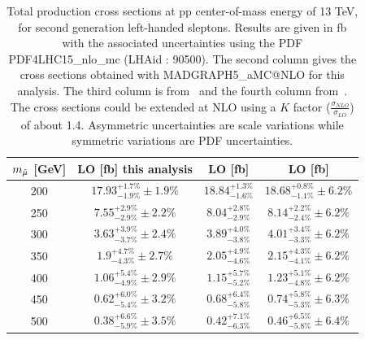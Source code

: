 \documentclass{cernatlasnote}
\begin{document}
\begin{appendices}
\begin{table}
    \centering
    \caption{Total production cross sections at pp center-of-mass  energy of 13 TeV, for second generation left-handed sleptons. Results are given in fb with the associated uncertainties using the PDF PDF4LHC15\_nlo\_mc (LHAid : 90500). The second column gives the cross sections obtained with MADGRAPH5\_aMC@NLO for this analysis. The third column is from~\cite{Fuks_2014} and the fourth column from~\cite{Fiaschi_2018}. The cross sections could be extended at NLO using a $K$ factor ($\frac{\sigma_{NLO}}{\sigma_{LO}}$) of about 1.4. Asymmetric uncertainties are scale variations while symmetric variations are PDF uncertainties.} 
    \label{tab:LEFTXS}
    \smallskip
    \begin{tabular}{ cccc }
         $m_{\Tilde{\mu}}$ [GeV]  & LO [fb] this analysis & LO [fb] \cite{Fuks_2014} & LO [fb] \cite{Fiaschi_2018} \\
         \hline
         200  & $17.93^{+1.7\%}_{-1.9\%} \pm 1.9\%$  & $18.84^{+1.3\%}_{-1.6\%}$ & $18.68^{+0.8\%}_{-1.1\%} \pm 6.2\%$ \\
         250  & $7.55^{+2.9\%}_{-2.9\%} \pm 2.2\% $  & $8.04^{+2.8\%}_{-2.9\%}$  & $8.14^{+2.2\%}_{-2.4\%} \pm 6.2\%$  \\
         300  & $3.63^{+3.9\%}_{-3.7\%} \pm 2.4\%$   & $3.89^{+4.0\%}_{-3.8\%}$  & $4.01^{+3.4\%}_{-3.3\%} \pm 6.2\%$ \\
         350  & $1.9^{+4.7\%}_{-4.3\%} \pm 2.7\%$    & $2.05^{+4.9\%}_{-4.6\%}$  & $2.15^{+4.3\%}_{-4.1\%} \pm 6.2\%$ \\
         400  & $1.06^{+5.4\%}_{-4.9\%} \pm 2.9\%$   & $1.15^{+5.7\%}_{-5.2\%}$  & $1.23^{+5.1\%}_{-4.8\%} \pm 6.2\%$ \\
         450  & $0.62^{+6.0\%}_{-5.4\%} \pm 3.2\%$   & $0.68^{+6.4\%}_{-5.8\%}$  & $0.74^{+5.8\%}_{-5.3\%} \pm 6.3\%$ \\
         500  & $0.38^{+6.6\%}_{-5.9\%} \pm 3.5\%$   & $0.42^{+7.1\%}_{-6.3\%}$  & $0.46^{+6.5\%}_{-5.8\%} \pm 6.4\%$ \\
    \end{tabular}
\end{table}


\end{appendices}
\end{document}

